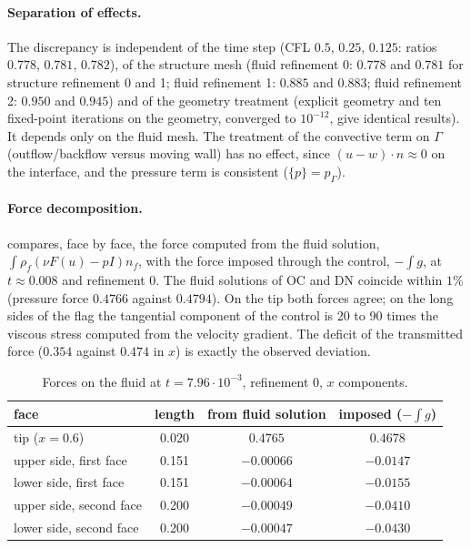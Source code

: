 \documentclass[11pt,a4paper]{article}
\theoremstyle{definition}
\theoremstyle{remark}
\newcommand{\G}{\Gamma}
\begin{document}
\paragraph{Separation of effects.} The discrepancy is independent of the time step (CFL $0.5$,
$0.25$, $0.125$: ratios $0.778$, $0.781$, $0.782$), of the structure mesh (fluid refinement 0:
$0.778$ and $0.781$ for structure refinement 0 and 1; fluid refinement 1: $0.885$ and $0.883$;
fluid refinement 2: $0.950$ and $0.945$) and of the geometry treatment (explicit geometry and ten
fixed-point iterations on the geometry, converged to $10^{-12}$, give identical results). It
depends only on the fluid mesh. The treatment of the convective term on $\G$ (outflow/backflow
versus moving wall) has no effect, since $(u-w)\cdot n\approx0$ on the interface, and the pressure
term is consistent ($\{p\}=p_\G$).

\paragraph{Force decomposition.}  compares, face by face, the force computed from
the fluid solution, $\int\rho_f(\nu F(u)-pI)n_f$, with the force imposed through the control,
$-\int g$, at $t\approx0.008$ and refinement 0. The fluid solutions of OC and DN coincide within
$1\%$ (pressure force $0.4766$ against $0.4794$). On the tip both forces agree; on the long sides of
the flag the tangential component of the control is 20 to 90 times the viscous stress computed
from the velocity gradient. The deficit of the transmitted force ($0.354$ against $0.474$ in $x$)
is exactly the observed deviation.

\begin{table}[ht]\centering
\caption{Forces on the fluid at $t=7.96\cdot10^{-3}$, refinement 0, $x$ components.}
\label{tab:faces}
\begin{tabular}{lccc}
\toprule
face & length & from fluid solution & imposed ($-\int g$)\\
\midrule
tip ($x=0.6$) & 0.020 & $0.4765$ & $0.4678$\\
upper side, first face & 0.151 & $-0.00066$ & $-0.0147$\\
lower side, first face & 0.151 & $-0.00064$ & $-0.0155$\\
upper side, second face & 0.200 & $-0.00049$ & $-0.0410$\\
lower side, second face & 0.200 & $-0.00047$ & $-0.0430$\\
\bottomrule
\end{tabular}
\end{table}
\end{document}

